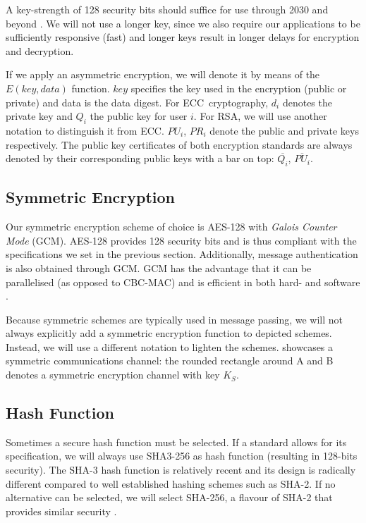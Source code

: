 A key-strength of 128 security bits should suffice for use through 2030 and beyond \cite[p.\ 55-56]{NIST-key-management}. We will not use a longer key, since we also require our applications to be sufficiently responsive (fast) and longer keys result in longer delays for encryption and decryption.

If we apply an asymmetric encryption, we will denote it by means of the $E(key,data)$ function. $key$ specifies the key used in the encryption (public or private) and data is the data digest. For ECC~cryptography, $d_i$ denotes the private key and $Q_i$ the public key for user $i$. For RSA, we will use another notation to distinguish it from ECC. $PU_i$, $PR_i$ denote the public and private keys respectively. The public key certificates of both encryption standards are always denoted by their corresponding public keys with a bar on top: $\overline{Q_i}$, $\overline{PU_i}$.

\subsection{Symmetric Encryption}

Our symmetric encryption scheme of choice is AES-128 with \emph{Galois Counter Mode} (GCM). AES-128 provides 128 security bits and is thus compliant with the specifications we set in the previous section. Additionally, message authentication is also obtained through GCM. GCM has the advantage that it can be parallelised (as opposed to CBC-MAC) and is efficient in both hard- and software \cite{NIST-GCM}.

Because symmetric schemes are typically used in message passing, we will not always explicitly add a symmetric encryption function to depicted schemes. Instead, we will use a different notation to lighten the schemes.  showcases a symmetric communications channel: the rounded rectangle around A and B denotes a symmetric encryption channel with key $K_S$.

\subsection{Hash Function}

Sometimes a secure hash function must be selected. If a standard allows for its specification, we will always use SHA3-256 as hash function (resulting in 128-bits security). The SHA-3 hash function is relatively recent and its design is radically different compared to well established hashing schemes such as SHA-2. If no alternative can be selected, we will select SHA-256, a flavour of SHA-2 that provides similar security \cite[p.\ 54]{NIST-key-management}.

